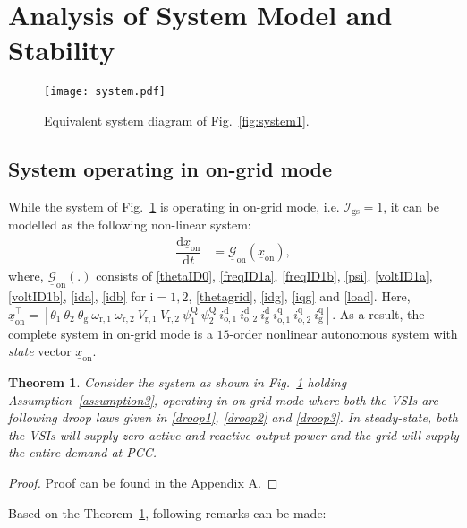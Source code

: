 \documentclass[journal]{IEEEtran}
\newtheorem{theorem}{Theorem}
\begin{document}
\section{Analysis of System Model and Stability}\label{analysis}
\begin{figure}[t]
	\centering
    \texttt{[image: system.pdf]}%
	\caption{Equivalent system diagram of Fig.~\ref{fig:system1}.}
	\label{fig:system}
\end{figure}
\subsection{System operating in on-grid mode}
While the system of Fig.~\ref{fig:system} is operating in on-grid mode, i.e. $\mathcal{I}_\mathrm{gs}=1$, it can be modelled as the following non-linear system:
\begin{align}\label{ongridmodel}
    \dfrac{\mathrm{d}\underline{x}_\mathrm{on}}{\mathrm{d}t}&=\underline{\mathcal{G}}_\mathrm{on}(\underline{x}_\mathrm{on}),
\end{align}
where, $\underline{\mathcal{G}}_\mathrm{on}(.)$ consists of \eqref{thetaID0}, \eqref{freqID1a}, \eqref{freqID1b}, \eqref{psi}, \eqref{voltID1a}, \eqref{voltID1b}, \eqref{ida}, \eqref{idb} for $\mathrm{i}=1,2$, \eqref{thetagrid}, \eqref{idg}, \eqref{iqg} and \eqref{load}. Here, $\underline{x}_\mathrm{on}^\top=[\theta_\mathrm{1}~\theta_\mathrm{2}~\theta_\mathrm{g}~\omega_\mathrm{r,1}~\omega_\mathrm{r,2}~V_\mathrm{r,1}~V_\mathrm{r,2}~\psi^\mathrm{Q}_\mathrm{1}~\psi^\mathrm{Q}_\mathrm{2}~i_\mathrm{o,1}^\mathrm{d}~i_\mathrm{o,2}^\mathrm{d}~i_\mathrm{g}^\mathrm{d}~i_\mathrm{o,1}^\mathrm{q}~i_\mathrm{o,2}^\mathrm{q}~i_\mathrm{g}^\mathrm{q}]$. As a result, the complete system in on-grid mode is a $15$-order nonlinear autonomous system with \textit{state} vector $\underline{x}_\mathrm{on}$.
\begin{theorem}\label{theorem1}
Consider the system as shown in Fig.~\ref{fig:system} holding Assumption~\ref{assumption3}, operating in on-grid mode where both the VSIs are following droop laws given in \eqref{droop1}, \eqref{droop2} and \eqref{droop3}. In steady-state, both the VSIs will supply zero active and reactive output power and the grid will supply the entire demand at PCC.
\end{theorem}
\begin{proof}
Proof can be found in the Appendix A.
\end{proof}
\noindent Based on the Theorem~\ref{theorem1}, following remarks can be made:
\end{document}
